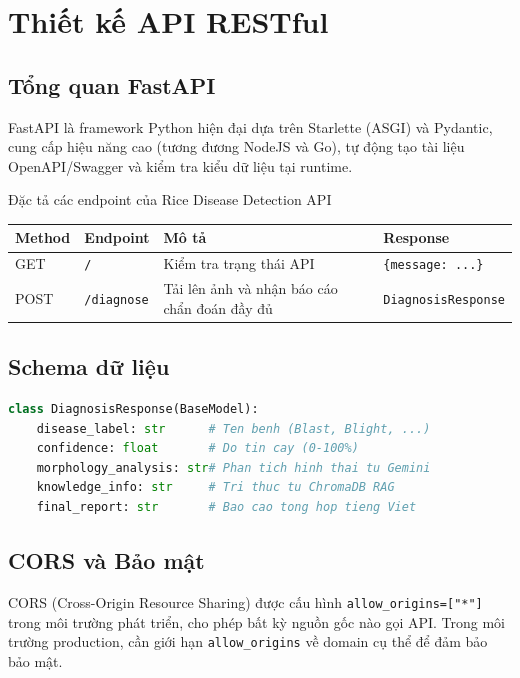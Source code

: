 \section{Thiết kế API RESTful}

\subsection{Tổng quan FastAPI}
FastAPI là framework Python hiện đại dựa trên Starlette (ASGI) và Pydantic, cung cấp hiệu năng cao (tương đương NodeJS và Go), tự động tạo tài liệu OpenAPI/Swagger và kiểm tra kiểu dữ liệu tại runtime.

\begin{table}[H]{Đặc tả các endpoint của Rice Disease Detection API}
\centering
\begin{tabularx}{\textwidth}{p{1.5cm} p{2.8cm} X p{3.5cm}}
\toprule
\textbf{Method} & \textbf{Endpoint} & \textbf{Mô tả} & \textbf{Response} \\
\midrule
GET  & \texttt{/}         & Kiểm tra trạng thái API & \texttt{\{message: ...\}} \\[4pt]
POST & \texttt{/diagnose} & Tải lên ảnh và nhận báo cáo chẩn đoán đầy đủ & \texttt{DiagnosisResponse} \\
\bottomrule
\end{tabularx}
\end{table}

\subsection{Schema dữ liệu}
\begin{lstlisting}[language=Python, caption={Pydantic response model cho endpoint /diagnose}, label={lst:pydantic}]
class DiagnosisResponse(BaseModel):
    disease_label: str      # Ten benh (Blast, Blight, ...)
    confidence: float       # Do tin cay (0-100%)
    morphology_analysis: str# Phan tich hinh thai tu Gemini
    knowledge_info: str     # Tri thuc tu ChromaDB RAG
    final_report: str       # Bao cao tong hop tieng Viet
\end{lstlisting}

\subsection{CORS và Bảo mật}
CORS (Cross-Origin Resource Sharing) được cấu hình \texttt{allow\_origins=["*"]} trong môi trường phát triển, cho phép bất kỳ nguồn gốc nào gọi API. Trong môi trường production, cần giới hạn \texttt{allow\_origins} về domain cụ thể để đảm bảo bảo mật.
